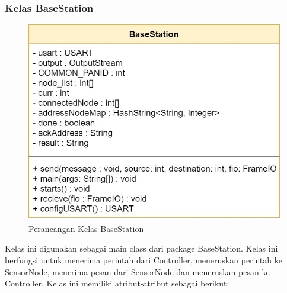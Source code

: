 \subsubsection{Kelas BaseStation}
\begin{figure}[H] 
	\centering  
	\includegraphics[scale=0.4]{Gambar/baseStation_class.jpg}
	\caption[Perancangan Kelas BaseStation]{Perancangan Kelas BaseStation}
	\label{fig:class_baseStation} 
\end{figure}
Kelas ini digunakan sebagai main class dari package BaseStation. Kelas ini berfungsi untuk menerima perintah dari Controller, meneruskan perintah ke SensorNode, menerima pesan dari SensorNode dan meneruskan pesan ke Controller. Kelas ini memiliki atribut-atribut sebagai berikut:

